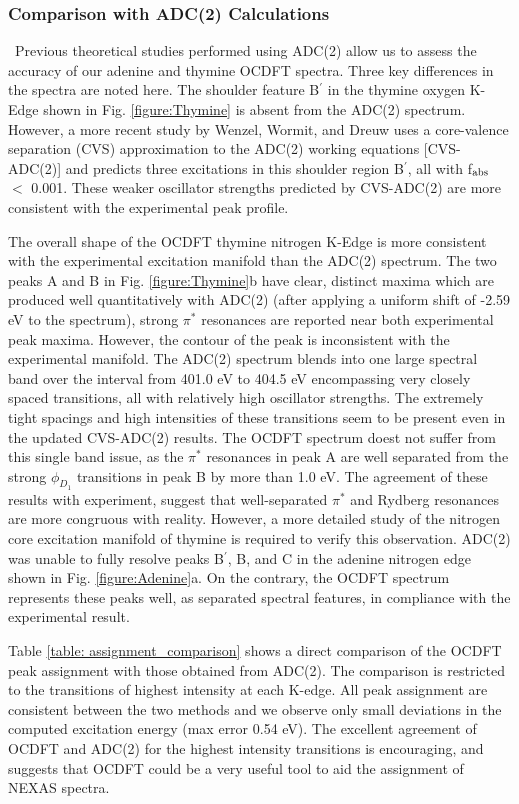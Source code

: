 \documentclass{article}
\begin{document}
\subsubsection{Comparison with ADC(2) Calculations} \
Previous theoretical studies performed using ADC(2) allow us to assess the accuracy of our adenine and thymine OCDFT spectra. Three key differences in the spectra are noted here. 
The shoulder feature B$^{\prime}$ in the thymine oxygen K-Edge shown in Fig. \ref{figure:Thymine} is absent from the ADC(2) spectrum.\cite{plekan_theoretical_2008} However, a more recent study by Wenzel, Wormit, and Dreuw \cite{wenzel_calculating_2014} uses a core-valence separation (CVS) approximation to the ADC(2) working equations [CVS-ADC(2)] and predicts three excitations in this shoulder region B$^{\prime}$, all with f$_{\rm abs}$ $<$ 0.001. These weaker oscillator strengths predicted by CVS-ADC(2) are more consistent with the experimental peak profile.

The overall shape of the OCDFT thymine nitrogen K-Edge is more consistent with the experimental excitation manifold than the ADC(2) spectrum. The two peaks A and B in Fig. \ref{figure:Thymine}b have clear, distinct maxima which are produced well quantitatively with ADC(2) (after applying a uniform shift of -2.59 eV to the spectrum), strong $\pi^*$ resonances are reported near both experimental peak maxima. However, the contour of the peak is inconsistent with the experimental manifold. The ADC(2) spectrum blends into one large spectral band over the interval from 401.0 eV to 404.5 eV encompassing very closely spaced transitions, all with relatively high oscillator strengths. The extremely tight spacings and high intensities of these transitions seem to be present even in the updated CVS-ADC(2) results. The OCDFT spectrum doest not suffer from this single band issue, as the $\pi^*$ resonances in peak A are well separated from the strong $\phi_{D_1}$ transitions in peak B by more than 1.0 eV. The agreement of these results with experiment, suggest that well-separated $\pi^*$ and Rydberg resonances are more congruous with reality. However, a more detailed study of the nitrogen core excitation manifold of thymine is required to verify this observation.
ADC(2) was unable to fully resolve peaks B$^{\prime}$, B, and C in the adenine nitrogen edge shown in Fig. \ref{figure:Adenine}a. On the contrary, the OCDFT spectrum represents these peaks well, as separated spectral features, in compliance with the experimental result. 

Table \ref{table: assignment_comparison} shows a direct comparison of the OCDFT peak assignment with those obtained from ADC(2).
The comparison is restricted to the transitions of highest intensity at each K-edge. All peak assignment are consistent between the two methods and we observe only small deviations in the computed excitation energy (max error 0.54 eV).
The excellent agreement of OCDFT and ADC(2) for the highest intensity transitions is encouraging, and suggests that OCDFT could be a very useful tool to aid the assignment of NEXAS spectra.
\end{document}
